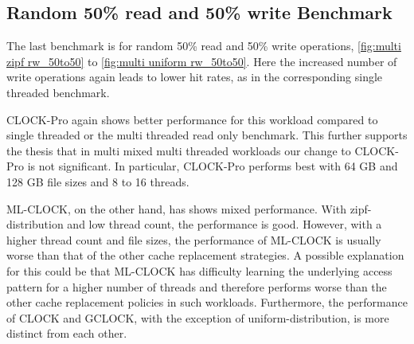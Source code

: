 \documentclass[
	12pt,
	a4paper,
	abstract,
	bibliography=totoc,
	chapterprefix,
	headings=openright,
	numbers=endperiod,
	parskip=half,
	twoside,
]{scrreprt}
\begin{document}
\newpage
\subsection{Random 50\% read and 50\% write Benchmark}

The last benchmark is for random 50\% read and 50\% write operations, \cref{fig:multi zipf rw_50to50} to 
\cref{fig:multi uniform rw_50to50}.
Here the increased number of write operations again leads to lower hit rates, 
as in the corresponding single threaded benchmark.

CLOCK-Pro again shows better  performance for this workload compared to single threaded or 
the multi threaded read only benchmark.
This further supports the thesis that in multi mixed multi threaded workloads our 
change to CLOCK-Pro is not significant.
In particular, CLOCK-Pro performs best with 64 GB and 128 GB 
file sizes and 8 to 16 threads.

ML-CLOCK, on the other hand, has shows mixed performance.
With zipf-distribution and low thread count, the performance is good.
However, with a higher thread count and file sizes, the performance of ML-CLOCK 
is usually worse than that of the other cache replacement strategies.
A possible explanation for this could be that ML-CLOCK has difficulty learning the 
underlying access pattern for a higher number of threads and 
therefore performs worse than the other cache replacement policies in such workloads.
Furthermore, the performance of CLOCK and GCLOCK, with the exception of uniform-distribution, 
is more distinct from each other.
\end{document}
